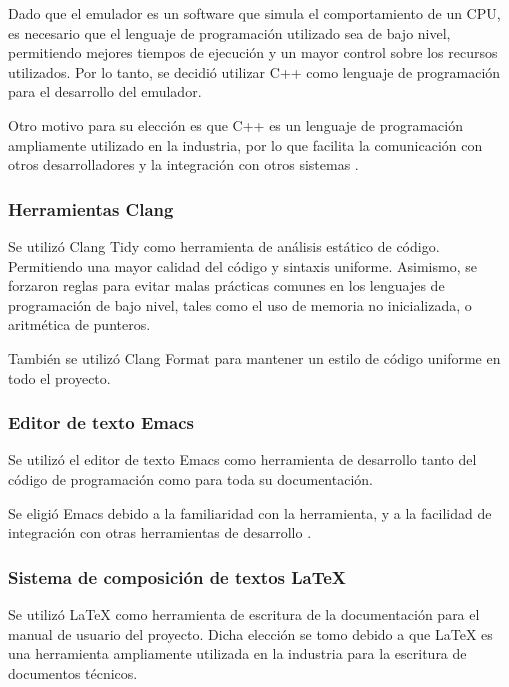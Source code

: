 Dado que el emulador es un software que simula el comportamiento de un CPU, es necesario que el lenguaje de programación utilizado sea de bajo nivel, permitiendo mejores tiempos de ejecución y un mayor control sobre los recursos utilizados. Por lo tanto, se decidió utilizar C++ como lenguaje de programación para el desarrollo del emulador.

Otro motivo para su elección es que C++ es un lenguaje de programación ampliamente utilizado en la industria, por lo que facilita la comunicación con otros desarrolladores y la integración con otros sistemas \citep{NASA_GITHUB}.

\subsubsection{Herramientas Clang}
\label{subsec:clang_tidy}

Se utilizó Clang Tidy \citep{CLANG_TIDY} como herramienta de análisis estático de código. Permitiendo una mayor calidad del código y sintaxis uniforme. Asimismo, se forzaron reglas para evitar malas prácticas comunes en los lenguajes de programación de bajo nivel, tales como el uso de memoria no inicializada, o aritmética de punteros.

También se utilizó Clang Format  \citep{CLANG_FORMAT} para mantener un estilo de código uniforme en todo el proyecto.


\subsubsection{Editor de texto Emacs}
\label{subsec:emacs}

Se utilizó el editor de texto Emacs \citep{EMACS} como herramienta de desarrollo tanto del código de programación como para toda su documentación.

Se eligió Emacs debido a la familiaridad con la herramienta, y a la facilidad de integración con otras herramientas de desarrollo \citep{MELPA}.


\subsubsection{Sistema de composición de textos LaTeX}
\label{subsec:latex}

Se utilizó LaTeX \citep{LATEX} como herramienta de escritura de la documentación para el manual de usuario del proyecto. Dicha elección se tomo debido a que LaTeX es una herramienta ampliamente utilizada en la industria para la escritura de documentos técnicos.

